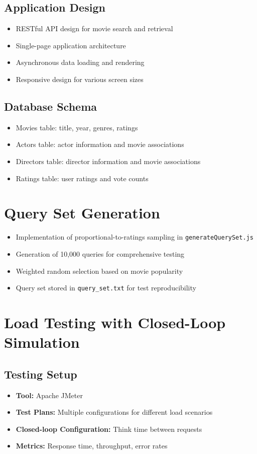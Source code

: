 \documentclass[12pt]{article}
\begin{document}
\subsection{Application Design}
\begin{itemize}
    \item RESTful API design for movie search and retrieval
    \item Single-page application architecture
    \item Asynchronous data loading and rendering
    \item Responsive design for various screen sizes
\end{itemize}

\subsection{Database Schema}
\begin{itemize}
    \item Movies table: title, year, genres, ratings
    \item Actors table: actor information and movie associations
    \item Directors table: director information and movie associations
    \item Ratings table: user ratings and vote counts
\end{itemize}

\section{Query Set Generation}
\begin{itemize}
    \item Implementation of proportional-to-ratings sampling in \texttt{generateQuerySet.js}
    \item Generation of 10,000 queries for comprehensive testing
    \item Weighted random selection based on movie popularity
    \item Query set stored in \texttt{query\_set.txt} for test reproducibility
\end{itemize}

\section{Load Testing with Closed-Loop Simulation}
\subsection{Testing Setup}
\begin{itemize}
    \item \textbf{Tool:} Apache JMeter
    \item \textbf{Test Plans:} Multiple configurations for different load scenarios
    \item \textbf{Closed-loop Configuration:} Think time between requests
    \item \textbf{Metrics:} Response time, throughput, error rates
\end{itemize}
\end{document}
